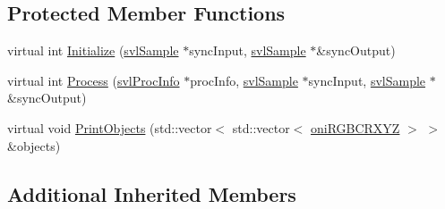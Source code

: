 \subsection*{Protected Member Functions}
\begin{DoxyCompactItemize}
\item 
virtual int \hyperlink{classsvl_filter_plane_segmentation_af73f17e29f048c22c4a26300ebc09b21}{Initialize} (\hyperlink{classsvl_sample}{svl\-Sample} $\ast$sync\-Input, \hyperlink{classsvl_sample}{svl\-Sample} $\ast$\&sync\-Output)
\item 
virtual int \hyperlink{classsvl_filter_plane_segmentation_a44264df4c7e046bee03272624edf3501}{Process} (\hyperlink{structsvl_proc_info}{svl\-Proc\-Info} $\ast$proc\-Info, \hyperlink{classsvl_sample}{svl\-Sample} $\ast$sync\-Input, \hyperlink{classsvl_sample}{svl\-Sample} $\ast$\&sync\-Output)
\item 
virtual void \hyperlink{classsvl_filter_plane_segmentation_ab5ebbbf2b69ab1f03155d2afb041680a}{Print\-Objects} (std\-::vector$<$ std\-::vector$<$ \hyperlink{structoni_r_g_b_c_r_x_y_z}{oni\-R\-G\-B\-C\-R\-X\-Y\-Z} $>$ $>$ \&objects)
\end{DoxyCompactItemize}
\subsection*{Additional Inherited Members}



